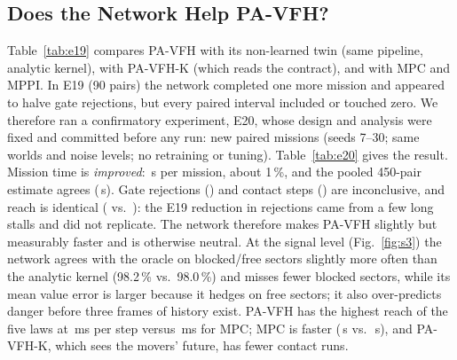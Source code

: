 \documentclass[journal]{IEEEtran}
\newcommand{\pavfh}{PA-VFH}
\begin{document}
\subsection{Does the Network Help \pavfh{}?}
Table~\ref{tab:e19} compares \pavfh{} with its non-learned twin (same pipeline,
analytic kernel), with PA-VFH-K (which reads the contract), and with MPC and
MPPI. In E19 (90 pairs) the network completed one more mission and appeared to
halve gate rejections, but every paired interval included or touched zero. We
therefore ran a confirmatory experiment, E20, whose design and analysis were
fixed and committed before any run: \EzeroN{} new paired missions (seeds 7--30;
same worlds and noise levels; no retraining or tuning). Table~\ref{tab:e20}
gives the result. Mission time is \emph{improved}: \EzeroTime\,s per mission,
about 1\,\%, and the pooled 450-pair estimate agrees (\EpoolTime\,s). Gate
rejections (\EzeroRej) and contact steps (\EzeroCon) are inconclusive, and reach
is identical (\EzeroReachNN{} vs.\ \EzeroReachNo{}): the E19 reduction in
rejections came from a few long stalls and did not replicate. The network
therefore makes \pavfh{} slightly but measurably faster and is otherwise
neutral. At the signal level (Fig.~\ref{fig:s3}) the network agrees with
the oracle on blocked/free sectors slightly more often than the analytic kernel
(98.2\,\% vs.\ 98.0\,\%) and misses fewer blocked sectors, while its mean value
error is larger because it hedges on free sectors; it also over-predicts danger
before three frames of history exist. \pavfh{} has the highest reach of the five
laws at \PavfhMs\,ms per step versus \MpcMs\,ms for MPC; MPC is faster
(\MpcTime\,s vs.\ \PavfhTime\,s), and PA-VFH-K, which sees the movers' future,
has fewer contact runs.

\begin{table}[t]
\centering
\caption{E19 ablation (450 runs; 5 worlds $\times$ 3 noise levels $\times$ 6
seeds; random phase). Top: pooled per law. Bottom: paired differences.}
\label{tab:e19}
\\[2mm]
\end{table}

\begin{table}[t]
\centering
\caption{E20, pre-registered confirmation: paired difference \pavfh{} $-$
\pavfh{} (no NN) on identical missions; 95\,\% bootstrap intervals (10{,}000
resamples). ``Improved'': interval entirely below zero.}
\label{tab:e20}
\end{table}
\end{document}
